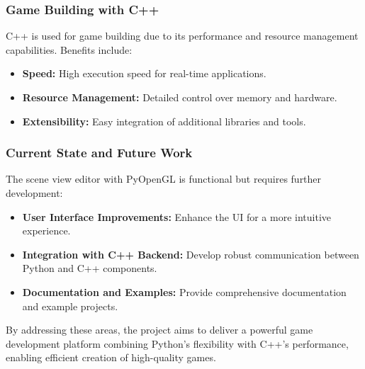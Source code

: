 \subsubsection*{Game Building with C++}

C++ is used for game building due to its performance and resource management capabilities. Benefits include:

\begin{itemize}
    \item \textbf{Speed:} High execution speed for real-time applications.
    \item \textbf{Resource Management:} Detailed control over memory and hardware.
    \item \textbf{Extensibility:} Easy integration of additional libraries and tools.
\end{itemize}

\subsubsection*{Current State and Future Work}

The scene view editor with PyOpenGL is functional but requires further development:

\begin{itemize}
    \item \textbf{User Interface Improvements:} Enhance the UI for a more intuitive experience.
    \item \textbf{Integration with C++ Backend:} Develop robust communication between Python and C++ components.
    \item \textbf{Documentation and Examples:} Provide comprehensive documentation and example projects.
\end{itemize}

By addressing these areas, the project aims to deliver a powerful game development platform combining Python's flexibility with C++'s performance, enabling efficient creation of high-quality games.




